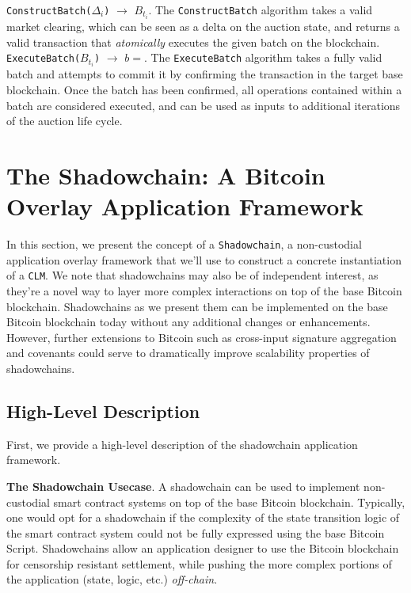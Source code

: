\documentclass[10pt,a4paper]{article}
\theoremstyle{definition}
\begin{document}
\texttt{ConstructBatch($\Delta_i$)} $\rightarrow$ $B_{t_i}$. The
\texttt{ConstructBatch} algorithm takes a valid market clearing, which can be
seen as a delta on the auction state, and returns a valid transaction that
\emph{atomically} executes the given batch on the blockchain. \\

\texttt{ExecuteBatch($B_{t_i}$)} $\rightarrow$ $b=$. The \texttt{ExecuteBatch}
algorithm takes a fully valid batch and attempts to commit it by confirming the
transaction in the target base blockchain. Once the batch has been confirmed,
all operations contained within a batch are considered executed, and can be
used as inputs to additional iterations of the auction life cycle.

\section{The Shadowchain: A Bitcoin Overlay Application Framework}

In this section, we present the concept of a \texttt{Shadowchain}, a
non-custodial application overlay framework that we'll use to construct a
concrete instantiation of a \texttt{CLM}. We note that shadowchains may also be
of independent interest, as they're a novel way to layer more complex
interactions on top of the base Bitcoin blockchain. Shadowchains as we present
them can be implemented on the base Bitcoin blockchain today without any
additional changes or enhancements. However, further extensions to Bitcoin such
as cross-input signature aggregation and covenants could serve to dramatically
improve scalability properties of shadowchains.

\subsection{High-Level Description}

First, we provide a high-level description of the shadowchain application
framework.

\textbf{The Shadowchain Usecase}. A shadowchain can be used to implement
non-custodial smart contract systems on top of the base Bitcoin blockchain.
Typically, one would opt for a shadowchain if the complexity of the state
transition logic of the smart contract system could not be fully expressed
using the base Bitcoin Script. Shadowchains allow an application designer to
use the Bitcoin blockchain for censorship resistant settlement, while pushing
the more complex portions of the application (state, logic, etc.)
\emph{off-chain}.
\end{document}
